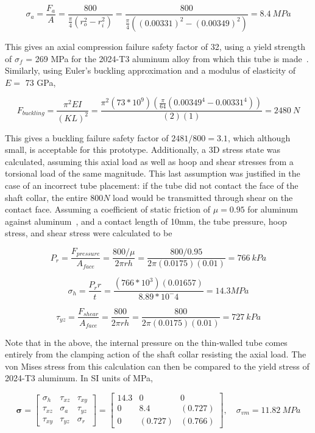 \documentclass[12pt]{report}
\begin{document}
\[
\sigma_a = \frac{F_a}{A} = \frac{800}{ \frac{\pi}{4} (r_o^2 - r_i^2) } = \frac{800}{ \frac{\pi}{4} ((0.00331)^2 - (0.00349)^2)} = 8.4 \ MPa
\]

This gives an axial compression failure safety factor of 32, using a yield strength of $\sigma_f$ = 269 MPa for the 2024-T3 aluminum alloy from which this tube is made~\cite{Aluminum2024_2014}. 
Similarly, using Euler's buckling approximation and a modulus of elasticity of $E =$ 73 GPa,

\[
F_{buckling} = \frac{\pi^2 E I}{(K L)^2} = \frac{\pi^2 (73 * 10^9) (\frac{\pi}{64} (0.00349^4 - 0.00331^4) )}{ (2) (1)} = 2480 \ N
\]

This gives a buckling failure safety factor of $2481 / 800 = 3.1$, which although small, is acceptable for this prototype.
Additionally, a 3D stress state was calculated, assuming this axial load as well as hoop and shear stresses from a torsional load of the same magnitude.
This last assumption was justified in the case of an incorrect tube placement: if the tube did not contact the face of the shaft collar, the entire $800N$ load would be transmitted through shear on the contact face.
Assuming a coefficient of static friction of $\mu = 0.95$ for aluminum against aluminum~\cite{AluminumFriction_2014}, and a contact length of 10mm, the tube pressure, hoop stress, and shear stress were calculated to be

\[
P_r = \frac{F_{pressure}}{A_{face}} = \frac{ 800/ \mu }{2 \pi r h} = \frac{ 800/ 0.95 }{2 \pi (0.0175) (0.01)} = 766 \ kPa
\]

\[
\sigma_h = \frac{P_r r}{t} = \frac{(766 * 10^3)(0.01657)}{8.89*10^-4} = 14.3 MPa
\]

\[
\tau_{yz} = \frac{F_{shear}}{A_{face}} = \frac{ 800 }{2 \pi r h} = \frac{ 800}{2 \pi (0.0175) (0.01)} = 727 \ kPa
\]

Note that in the above, the internal pressure on the thin-walled tube comes entirely from the clamping action of the shaft collar resisting the axial load.
The von Mises stress from this calculation can then be compared to the yield stress of 2024-T3 aluminum. In SI units of MPa,

\[
\boldsymbol{\sigma} = \left[ \begin{array}{ccc}
    \sigma_h & \tau_{xz} & \tau_{xy} \\
    \tau_{xz} & \sigma_a & \tau_{yz} \\
    \tau_{xy} & \tau_{yz} & \sigma_r
\end{array} \right]
=
\left[ \begin{array}{ccc}
    14.3 & 0 & 0 \\
    0 & 8.4 & (0.727) \\
    0 & (0.727) & (0.766)
\end{array} \right],
\quad
\sigma_{vm} = 11.82 \ MPa
\]
\end{document}
